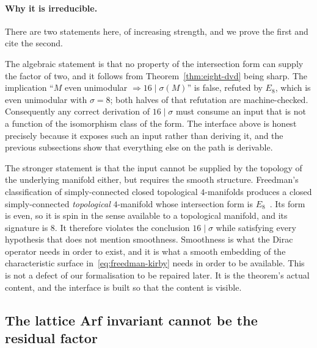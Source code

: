 \paragraph{Why it is irreducible.}
There are two statements here, of increasing strength, and we prove the
first and cite the second.

The algebraic statement is that no property of the intersection form can
supply the factor of two, and it follows from
Theorem~\ref{thm:eight-dvd} being sharp. The implication ``$M$ even
unimodular $\Rightarrow 16 \mid \sigma(M)$'' is false, refuted by $E_8$,
which is even unimodular with $\sigma = 8$; both halves of that
refutation are machine-checked. Consequently any correct derivation of
$16\mid\sigma$ must consume an input that is not a function of the
isomorphism class of the form. The interface above is honest precisely
because it exposes such an input rather than deriving it, and the previous
subsections show that everything else on the path is derivable.

The stronger statement is that the input cannot be supplied by the
topology of the underlying manifold either, but requires the smooth
structure. Freedman's classification of simply-connected closed
topological $4$-manifolds produces a closed simply-connected
\emph{topological} $4$-manifold whose intersection form is
$E_8$~\cite{Freedman1982}.
Its form is even, so it is spin in the sense available to a topological
manifold, and its signature is $8$. It therefore violates the conclusion
$16\mid\sigma$ while satisfying every hypothesis that does not mention
smoothness. Smoothness is what the Dirac operator needs in order to exist,
and it is what a smooth embedding of the characteristic surface
in~\eqref{eq:freedman-kirby} needs in order to be available. This is not
a defect of our formalisation to be repaired later. It is the theorem's
actual content, and the interface is built so that the content is visible.

\subsection{The lattice Arf invariant cannot be the residual factor}
\label{sec:sig-arf}

